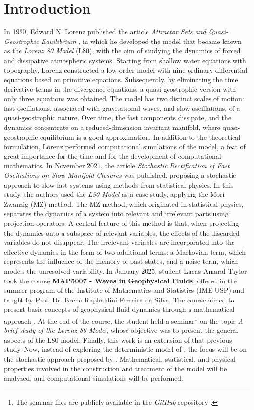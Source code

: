\documentclass[12pt]{article}
\begin{document}
\section*{Introduction}
In 1980, Edward N. Lorenz published the article \textit{Attractor Sets and Quasi-Geostrophic Equilibrium} \citep{Lorenz1980}, in which he developed the model that became known as the \textit{Lorenz 80 Model} (L80), with the aim of studying the dynamics of forced and dissipative atmospheric systems.
Starting from shallow water equations with topography, Lorenz constructed a low-order model with nine ordinary differential equations based on primitive equations. Subsequently, by eliminating the time derivative terms in the divergence equations, a quasi-geostrophic version with only three equations was obtained. The model has two distinct scales of motion: fast oscillations, associated with gravitational waves, and slow oscillations, of a quasi-geostrophic nature. Over time, the fast components dissipate, and the dynamics concentrate on a reduced-dimension invariant manifold, where quasi-geostrophic equilibrium is a good approximation. In addition to the theoretical formulation, Lorenz performed computational simulations of the model, a feat of great importance for the time and for the development of computational mathematics.
In November 2021, the article \textit{Stochastic Rectification of Fast Oscillations on Slow Manifold Closures} \citep{Chekroun2021} was published, proposing a stochastic approach to slow-fast systems using methods from statistical physics. In this study, the authors used the \textit{L80 Model} as a case study, applying the Mori-Zwanzig (MZ) method.
The MZ method, which originated in statistical physics, separates the dynamics of a system into relevant and irrelevant parts using projection operators. A central feature of this method is that, when projecting the dynamics onto a subspace of relevant variables, the effects of the discarded variables do not disappear. The irrelevant variables are incorporated into the effective dynamics in the form of two additional terms: a Markovian term, which represents the influence of the memory of past states, and a noise term, which models the unresolved variability.
In January 2025, student Lucas Amaral Taylor took the course \textbf{MAP5007 - Waves in Geophysical Fluids}, offered in the summer program of the Institute of Mathematics and Statistics (IME-USP) and taught by Prof. Dr. Breno Raphaldini Ferreira da Silva. The course aimed to present basic concepts of geophysical fluid dynamics through a mathematical approach \citep{uspJanus}. At the end of the course, the student held a seminar\footnote{The seminar files are publicly available in the \textit{GitHub} repository \citep{TaylorL80}.} on the topic \textit{A brief study of the Lorenz 80 Model}, whose objective was to present the general aspects of the L80 model.
Finally, this work is an extension of that previous study. Now, instead of exploring the deterministic model of \citet{Lorenz1980}, the focus will be on the stochastic approach proposed by \citet{Chekroun2021}. Mathematical, statistical, and physical properties involved in the construction and treatment of the model will be analyzed, and computational simulations will be performed.
    
\end{document}
